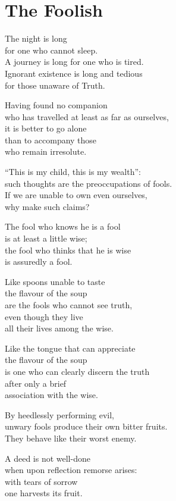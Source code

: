 
\chapter{The Foolish}

The night is long\\
for one who cannot sleep.\\
A journey is long for one who is tired.\\
Ignorant existence is long and tedious\\
for those unaware of Truth.


Having found no companion\\
who has travelled at least as far as ourselves,\\
it is better to go alone\\
than to accompany those\\
who remain irresolute.


“This is my child, this is my wealth”:\\
such thoughts are the preoccupations of fools.\\
If we are unable to own even ourselves,\\
why make such claims?


The fool who knows he is a fool\\
is at least a little wise;\\
the fool who thinks that he is wise\\
is assuredly a fool.


Like spoons unable to taste\\
the flavour of the soup\\
are the fools who cannot see truth,\\
even though they live\\
all their lives among the wise.


Like the tongue that can appreciate\\
the flavour of the soup\\
is one who can clearly discern the truth\\
after only a brief\\
association with the wise.


By heedlessly performing evil,\\
unwary fools produce their own bitter fruits.\\
They behave like their worst enemy.

A deed is not well-done\\
when upon reflection remorse arises:\\
with tears of sorrow\\
one harvests its fruit.



